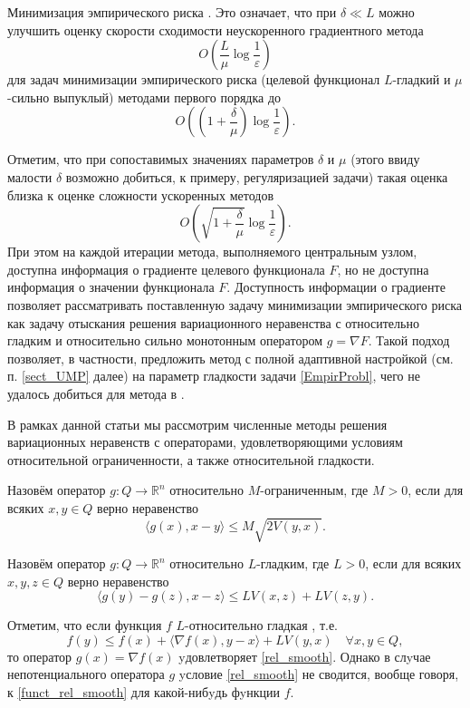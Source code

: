\begin{example}{Минимизация эмпирического риска \cite{Hendr}.}
    Это означает, что при $\delta \ll L$ можно улучшить оценку скорости сходимости неускоренного градиентного метода $$O\left(\frac{L}{\mu}\log\frac{1}{\varepsilon}\right)$$
    для задач минимизации эмпирического риска (целевой функционал $L$-гладкий и $\mu$-сильно выпуклый) методами первого порядка до $$O\left(\left(1+\frac{\delta}{\mu}\right)\log\frac{1}{\varepsilon}\right).$$
    	
    Отметим, что при сопоставимых значениях параметров $\delta$ и $\mu$ (этого ввиду малости $\delta$ возможно добиться, к примеру, регуляризацией задачи) такая оценка близка к оценке сложности ускоренных методов
    	$$O\left(\sqrt{1+\frac{\delta}{\mu}}\log\frac{1}{\varepsilon}\right).$$
    При этом на каждой итерации метода, выполняемого центральным узлом, доступна информация о градиенте целевого функционала $F$, но не доступна информация о значении функционала $F$. Доступность информации о градиенте позволяет рассматривать поставленную задачу минимизации эмпирического риска как задачу отыскания решения вариационного неравенства с относительно гладким и относительно сильно монотонным оператором $g = \nabla F$. Такой подход позволяет, в частности, предложить метод с полной адаптивной настройкой (см. п. \ref{sect_UMP} далее) на параметр гладкости задачи \eqref{EmpirProbl}, чего не удалось добиться для метода в \cite{Hendr}. 
    \end{example}

    В рамках данной статьи мы рассмотрим численные методы решения вариационных неравенств с операторами, удовлетворяющими условиям относительной ограниченности, а также относительной гладкости.
    \begin{definition}\label{DefRelBound}\cite{Main}
    Назовём оператор $g: Q \longrightarrow \mathbb{R}^n$ относительно $M$-огранич\-енным, где $M >0$, если для всяких $x, y \in Q$ верно неравенство
    	\begin{equation}\label{rel_bound}
    	 	\langle g(x), x - y \rangle \leq M\sqrt{2V(y,x)}.
    	 \end{equation}
    \end{definition}
    \begin{definition}\cite{Inex}
    Назовём оператор $g: Q \longrightarrow \mathbb{R}^n$ относительно $L$-гладким, где $L > 0$, если для всяких $x, y, z \in Q$ верно неравенство
    \begin{equation}\label{rel_smooth}
        \langle g(y)-g(z),x-z\rangle \leq LV(x,z) + LV(z,y).
        \end{equation}
    \end{definition}
    Отметим, что если функция $f$ $L$-относительно гладкая \cite{Bauschke}, т.е.
    \begin{equation}\label{funct_rel_smooth}
    f(y) \leq f(x) + \langle \nabla f(x), y - x\rangle + LV(y, x) \quad \forall x, y \in Q,
    \end{equation}
    то оператор $g(x) = \nabla f(x)$ yдовлетворяет \eqref{rel_smooth}. Однако в слyчае непотенциального оператора $g$ yсловие \eqref{rel_smooth} не сводится, вообще говоря, к \eqref{funct_rel_smooth} для какой-нибyдь фyнкции $f$.


